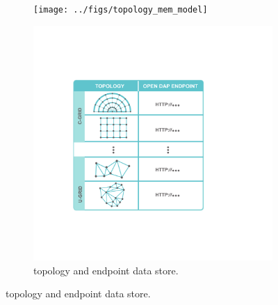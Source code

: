 \begin{figure}[ht!]
  \centering
  \begin{subfigure}[t]{0.45\textwidth}
    \texttt{[image: ../figs/topology\_mem\_model]}
  \end{subfigure}
  \begin{subfigure}[t]{0.455\textwidth}
    \includegraphics[width=\textwidth]{../figs/sciwms_book_db_topology_endpoints.pdf}
    \caption{\Sciwms{} topology and endpoint data store.}
    \label{fig:sciwms_topology_endpoints}
  \end{subfigure}
\end{figure}


